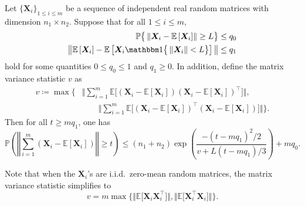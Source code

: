 %
\begin{theorem}
\label{thm:matrix-Bernstein}
Let $\{\bm{X}_{i}\}_{1\leq i\leq m}$ be a sequence of independent real random matrices with dimension $n_{1}\times n_{2}$. Suppose that for all $1\leq i\leq m$,
%
%
\begin{subequations} 	\label{eq:mean-zero-bound-B-truncated}
\begin{align}
	\mathbb{P}\big\{\left\Vert \bm{X}_{i}- \mathbb{E}\left[\bm{X}_{i}\right] \right\Vert \geq L \big\} & \leq q_{0}  \\
	\big\| \mathbb{E}\left[\bm{X}_{i}\right]- \mathbb{E}\left[\bm{X}_{i}\mathbbm1\big\{\left\Vert \bm{X}_{i}\right\Vert < L \big\}\right] \big\| & \leq q_{1}
\end{align}	
\end{subequations}
%
hold for some quantities $0 \leq q_0 \leq 1$ and $q_1 \geq 0$. In addition, define  the matrix variance statistic $v$  as
%
\begin{align}
	v \coloneqq
	\max\Bigg\{ & \Bigg\Vert \sum_{i=1}^m\mathbb{E}\Big[(\bm{X}_{i}-\mathbb{E}\left[\bm{X}_{i}\right])(\bm{X}_{i}-\mathbb{E}\left[\bm{X}_{i}\right])^{\top}\Big]\Bigg\Vert , \nonumber \\
 &	\qquad   \Bigg\Vert \sum_{i=1}^m\mathbb{E}\Big[(\bm{X}_{i}-\mathbb{E}\left[\bm{X}_{i}\right])^{\top}(\bm{X}_{i}-\mathbb{E}\left[\bm{X}_{i}\right])\Big]\Bigg\Vert \Bigg\} .
	\label{defn:variance-statistic}
\end{align}
%
Then for all $t\geq  mq_1$, one has
\[
	\mathbb{P}\left( \left\Vert \sum_{i=1}^m(\bm{X}_{i}-\mathbb{E}\left[\bm{X}_{i}\right])\right\Vert \geq t\right)\leq\left(n_{1}+n_{2}\right) \exp\left(\frac{-(t- mq_1)^{2}/2}{v+L(t-mq_1)/3}\right) + mq_0.
\]
\end{theorem}
%
\begin{remark}
Note that when the $\bm{X}_{i}$'s are  i.i.d.~zero-mean random matrices, the matrix variance statistic simplifies  to
$$
  v = m \max \Big\{ \big\Vert \mathbb{E}\big[\bm{X}_{i}\bm{X}_{i}^{\top}\big]\big\Vert,
	\big\Vert \mathbb{E}\big[\bm{X}_{i}^{\top} \bm{X}_{i}\big]\big\Vert \Big\}.
$$
\end{remark}


